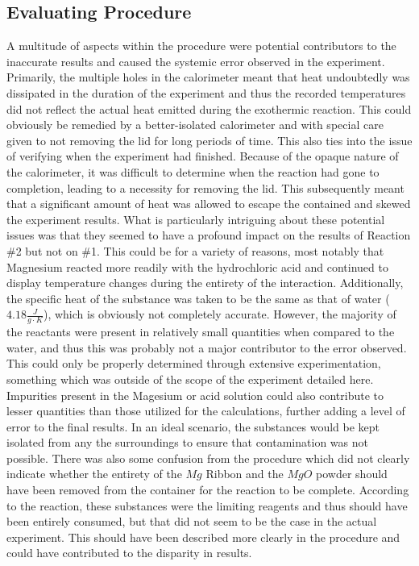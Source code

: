 \documentclass[12pt]{article}
\begin{document}
\subsection{Evaluating Procedure}
A multitude of aspects within the procedure were potential contributors to the inaccurate results and caused the systemic error observed in the experiment. Primarily, the multiple holes in the calorimeter meant that heat undoubtedly was dissipated in the duration of the experiment and thus the recorded temperatures did not reflect the actual heat emitted during the exothermic reaction. This could obviously be remedied by a better-isolated calorimeter and with special care given to not removing the lid for long periods of time. This also ties into the issue of verifying when the experiment had finished. Because of the opaque nature of the calorimeter, it was difficult to determine when the reaction had gone to completion, leading to a necessity for removing the lid. This subsequently meant that a significant amount of heat was allowed to escape the contained and skewed the experiment results. What is particularly intriguing about these potential issues was that they seemed to have a profound impact on the results of Reaction \#2 but not on \#1. This could be for a variety of reasons, most notably that Magnesium reacted more readily with the hydrochloric acid and continued to display temperature changes during the entirety of the interaction. Additionally, the specific heat of the substance was taken to be the same as that of water ($4.18 \frac{J}{g \cdot K}$), which is obviously not completely accurate. However, the majority of the reactants were present in relatively small quantities when compared to the water, and thus this was probably not a major contributor to the error observed. This could only be properly determined through extensive experimentation, something which was outside of the scope of the experiment detailed here. Impurities present in the Magesium or acid solution could also contribute to lesser quantities than those utilized for the calculations, further adding a level of error to the final results. In an ideal scenario, the substances would be kept isolated from any the surroundings to ensure that contamination was not possible. There was also some confusion from the procedure which did not clearly indicate whether the entirety of the $Mg$ Ribbon and the $MgO$ powder should have been removed from the container for the reaction to be complete. According to the reaction, these substances were the limiting reagents and thus should have been entirely consumed, but that did not seem to be the case in the actual experiment. This should have been described more clearly in the procedure and could have contributed to the disparity in results.
\end{document}
